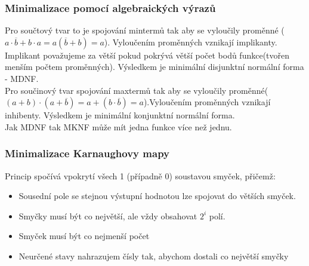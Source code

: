 \subsubsection{Minimalizace pomocí algebraických výrazů}
Pro součtový tvar to je spojování mintermů tak aby se vyloučily proměnné (\(a \cdot \overline{b} + b \cdot a = a(\overline{b} + b) = a\)). Vyloučením proměnných vznikají implikanty. Implikant považujeme za větší pokud pokrývá větší počet bodů funkce(tvořen menším počtem proměnných). Výsledkem je minimální disjunktní normální forma - MDNF.\\
Pro součinový tvar spojování maxtermů tak aby se vyloučily proměnné(\((a+b)\cdot(a+\overline{b}) = a + (b \cdot \overline{b}) = a\)).Vyloučením proměnných vznikají inhibenty. Výsledkem je minimální konjunktní normální forma. \\
Jak MDNF tak MKNF může mít jedna funkce více než jednu.

\subsubsection{Minimalizace Karnaughovy mapy}
Princip spočívá vpokrytí všech 1 (případně 0) soustavou smyček, přičemž:
\begin{itemize}
    \item Sousední pole se stejnou výstupní hodnotou lze spojovat do větších smyček.
    \item Smyčky musí být co největší, ale vždy obsahovat \(2^i\) polí.
    \item Smyček musí být co nejmenší počet
    \item Neurčené stavy nahrazujem čísly tak, abychom dostali co největší smyčky
\end{itemize}

